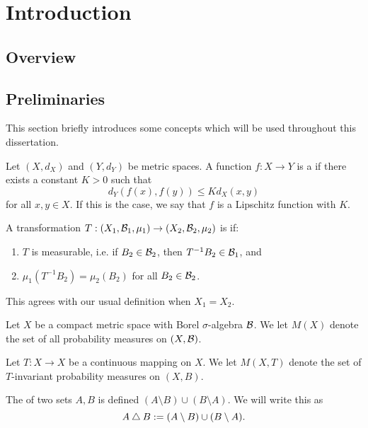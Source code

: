 \chapter{Introduction}
\section{Overview}

\section{Preliminaries}
This section briefly introduces some concepts which will be used throughout this dissertation.

\begin{definition}
	Let $(X, d_X)$ and $(Y, d_Y)$ be metric spaces. A function $f : X \to Y$ is a  if there exists a constant $K > 0$ such that
	\[
		d_Y(f(x), f(y)) \leq Kd_X(x, y)
	\]
	for all $x, y \in X$. If this is the case, we say that $f$ is a Lipschitz function with  $K$.~\cite[p154]{searcoid:metric-spaces}
\end{definition}

\begin{definition}
	A transformation $T : (X_1, \mathcal{B}_1, \mu_1) \to (X_2, \mathcal{B}_2, \mu_2)$ is  if:
	\begin{enumerate}
		\item $T$ is measurable, i.e. if $B_2 \in \mathcal{B}_2$, then $T^{-1}{B_2} \in \mathcal{B}_1$, and
		\item $\mu_1(T^{-1}{B_2}) = \mu_2(B_2)$ for all $B_2 \in \mathcal{B}_2$.
	\end{enumerate}
	This agrees with our usual definition when $X_1 = X_2$.
\end{definition}

\begin{definition}
	Let $X$ be a compact metric space with Borel $\sigma$-algebra $\mathcal{B}$. We let $M(X)$ denote the set of all probability measures on $(X, \mathcal{B})$.
	
	Let $T : X \to X$ be a continuous mapping on $X$. We let $M(X, T)$ denote the set of $T$-invariant probability measures on $(X, B)$.
\end{definition}

\begin{definition}
	The  of two sets $A, B$ is defined $(A \setminus B) \cup (B \setminus A)$. We will write this as
	\[
		A \bigtriangleup B := (A \setminus B) \cup (B \setminus A).
	\]
\end{definition}